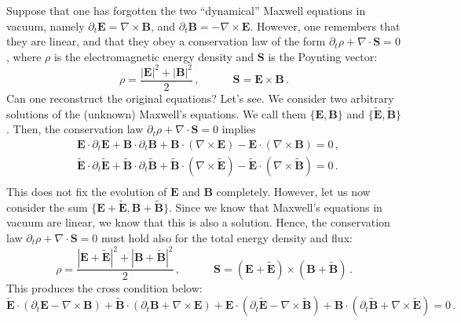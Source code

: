 \documentclass[aps,prl,singlecolumn,nofootinbib]{revtex4-2}
\newcommand{\spc}{\quad \quad \quad}
\theoremstyle{definition}
\theoremstyle{theorem}
\begin{document}
Suppose that one has forgotten the two ``dynamical'' Maxwell equations in vacuum, namely $\partial_t \textbf{E}=\nabla \times \textbf{B}$, and $\partial_t \textbf{B}=-\nabla \times \textbf{E}$. However, one remembers that they are linear, and that they obey a conservation law of the form $\partial_t \rho + \nabla \cdot \textbf{S}=0$, where $\rho$ is the electromagnetic energy density and $\textbf{S}$ is the Poynting vector:
\begin{equation}
\rho = \dfrac{|\textbf{E}|^2 + |\textbf{B}|^2}{2} \, , \spc \textbf{S}= \textbf{E} \times \textbf{B} \, .
\end{equation}
Can one reconstruct the original equations? Let's see. We consider two arbitrary solutions of the (unknown) Maxwell's equations. We call them $\{\textbf{E},\textbf{B} \}$ and $\{ \tilde{\textbf{E}},\tilde{\textbf{B}} \}$. Then, the conservation law $\partial_t \rho + \nabla \cdot \textbf{S}=0$ implies
\begin{equation}\label{eormf}
\begin{split}
& \textbf{E} \cdot \partial_t \textbf{E} + \textbf{B} \cdot \partial_t \textbf{B} + \textbf{B} \cdot (\nabla \times \textbf{E})- \textbf{E} \cdot (\nabla \times \textbf{B}) =0 \, , \\
& \tilde{\textbf{E}} \cdot \partial_t \tilde{\textbf{E}} + \tilde{\textbf{B}} \cdot \partial_t \tilde{\textbf{B}} + \tilde{\textbf{B}} \cdot (\nabla \times \tilde{\textbf{E}})- \tilde{\textbf{E}} \cdot (\nabla \times \tilde{\textbf{B}}) =0 \, .\\
\end{split}
\end{equation}
This does not fix the evolution of $\textbf{E}$ and $\textbf{B}$ completely. However, let us now consider the sum $\{\textbf{E}+\tilde{\textbf{E}},\textbf{B}+\tilde{\textbf{B}} \}$. Since we know that Maxwell's equations in vacuum are linear, we know that this is also a solution. Hence, the conservation law $\partial_t \rho + \nabla \cdot \textbf{S}=0$ must hold also for the total energy density and flux:
\begin{equation}
\rho = \dfrac{|\textbf{E}+\tilde{\textbf{E}}|^2 + |\textbf{B}+\tilde{\textbf{B}}|^2}{2} \, , \spc \textbf{S}= (\textbf{E}+\tilde{\textbf{E}}) \times (\textbf{B}+\tilde{\textbf{B}}) \, .
\end{equation}
This produces the cross condition below:
\begin{equation}\label{gbuf}
\tilde{\textbf{E}} \cdot (\partial_t \textbf{E}-\nabla \times \textbf{B}) + \tilde{\textbf{B}} \cdot (\partial_t \textbf{B}+\nabla \times \textbf{E} ) +\textbf{E} \cdot (\partial_t \tilde{\textbf{E}}-\nabla \times \tilde{\textbf{B}}) + \textbf{B} \cdot (\partial_t \tilde{\textbf{B}}+\nabla \times \tilde{\textbf{E}} ) =0 \, .
\end{equation}
\end{document}
